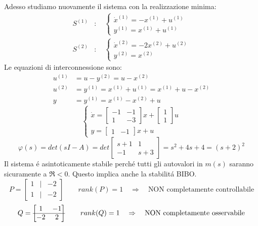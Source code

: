 \documentclass[../main.tex]{subfiles}
\begin{document}
\begin{mdframed}[style=Exercise]
\begin{Exercise}[title={Studio di un sistema dato in $ T(s) $}]
				Adesso studiamo nuovamente il sistema con la realizzazione minima:
				\[
					\begin{aligned}
						S^{(1)}&: \quad
						\begin{cases}
							\dot x^{(1)} = -x^{(1)} + u^{(1)}\\
							y^{(1)} = x^{(1)} + u^{(1)}
						\end{cases}
						\\
						S^{(2)}&: \quad
						\begin{cases}
							\dot x^{(2)} = -2x^{(2)} + u^{(2)}\\
							y^{(2)} = x^{(2)}
						\end{cases}
					\end{aligned}
				\]
				Le equazioni di interconnessione sono:
				\[
					\begin{aligned}
						u^{(1)} &= u - y^{(2)} = u - x^{(2)}\\
						u^{(2)} &= y^{(1)} = x^{(1)} + u^{(1)} = x^{(1)} + u - x^{(2)}\\
						y &= y^{(1)} = x^{(1)} - x^{(2)} + u
					\end{aligned}
				\]
				\[
					\begin{cases}
						\dot x = 
						\begin{bmatrix}
							-1 & -1\\
							1 & -3
						\end{bmatrix} x+
						\begin{bmatrix}
							1\\
							1
						\end{bmatrix} u
						\\
						y =
						\begin{bmatrix}
							1 & -1
						\end{bmatrix} x + u
					\end{cases}
				\]
				\[
					\varphi(s) = det(sI-A) = det
					\begin{bmatrix}
						s+1 & 1\\
						-1 & s+3
					\end{bmatrix} =
					s^2 + 4s + 4 = (s+2)^2
				\]
				Il sistema \'e asintoticamente stabile perch\'e tutti gli autovalori in $ m(s) $ saranno sicuramente a $ \Re < 0 $. Questo implica anche la stabilit\'a BIBO.
				\[
					P =
					\begin{bmatrix}
						1 & | & -2\\
						1 & | & -2
					\end{bmatrix}
					\qquad
					rank(P) = 1
					\quad\Rightarrow\quad \text{NON completamente controllabile}
				\]
				\[
					Q =
					\begin{bmatrix}
						1 & -1
						\\\cline{1-2}
						-2 & 2
					\end{bmatrix}
					\qquad
					rank(Q) = 1
					\quad\Rightarrow\quad \text{NON completamente osservabile}
				\]
			\end{Exercise}
		\end{mdframed}
\end{document}

